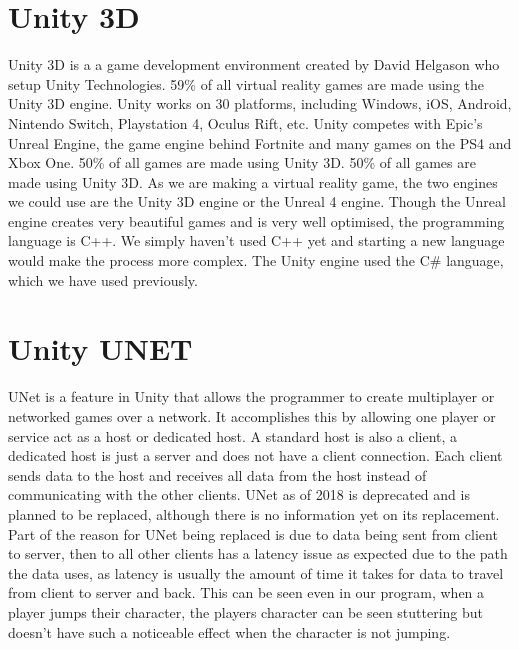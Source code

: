 
\section {Unity 3D}
Unity 3D is a a game development environment created by David Helgason who setup Unity Technologies. 59\% of all virtual reality games are made using the Unity 3D engine. Unity works on 30 platforms, including Windows, iOS, Android, Nintendo Switch, Playstation 4, Oculus Rift, etc. Unity competes with Epic’s Unreal Engine, the game engine behind Fortnite and many games on the PS4 and Xbox One. 50\% of all games are made using Unity 3D. 50\% of all games are made using Unity 3D. As we are making a virtual reality game, the two engines we could use are the Unity 3D engine or the Unreal 4 engine. Though the Unreal engine creates very beautiful games and is very well optimised, the programming language is C++. We simply haven't used C++ yet and starting a new language would make the process more complex. The Unity engine used the C# language, which we have used previously.

\section {Unity UNET}
UNet is a feature in Unity that allows the programmer to create multiplayer or networked games over a network. It accomplishes this by allowing one player or service act as a host or dedicated host. A standard host is also a client, a dedicated host is just a server and does not have a client connection. Each client sends data to the host and receives all data from the host instead of communicating with the other clients. UNet as of 2018 is deprecated and is planned to be replaced, although there is no information yet on its replacement. Part of the reason for UNet being replaced is due to data being sent from client to server, then to all other clients has a latency issue as expected due to the path the data uses, as latency is usually the amount of time it takes for data to travel from client to server and back. This can be seen even in our program, when a player jumps their character, the players character can be seen stuttering but doesn't have such a noticeable effect when the character is not jumping.